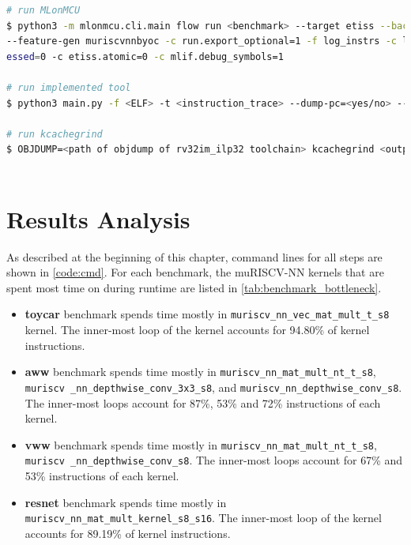 \medskip
\begin{center}
\begin{minipage}{\textwidth}
\begin{lstlisting}[language=bash]
# run MLonMCU
$ python3 -m mlonmcu.cli.main flow run <benchmark> --target etiss --backend tvmaotplus
--feature-gen muriscvnnbyoc -c run.export_optional=1 -f log_instrs -c log_instrs.to_file=1 -c riscv_gcc.install_dir=<path to rv32im_ilp32> -c etiss.fpu=none -c etiss.compr
essed=0 -c etiss.atomic=0 -c mlif.debug_symbols=1

# run implemented tool
$ python3 main.py -f <ELF> -t <instruction_trace> --dump-pc=<yes/no> --dump-pos=<yes/no>

# run kcachegrind
$ OBJDUMP=<path of objdump of rv32im_ilp32 toolchain> kcachegrind <output file from implemented tool>
    
\end{lstlisting}
\end{minipage}
\end{center}

\section{Results Analysis}

As described at the beginning of this chapter, command lines for all steps are shown in \cref{code:cmd}. For each benchmark, the muRISCV-NN kernels that are spent most time on during runtime are listed in \cref{tab:benchmark_bottleneck}.

\begin{itemize}
    \item \textbf{toycar} benchmark spends time mostly in \texttt{muriscv\_nn\_vec\_mat\_mult\_t\_s8} kernel. The inner-most loop of the kernel accounts for 94.80\% of kernel instructions.
        
    \item \textbf{aww} benchmark spends time mostly in \texttt{muriscv\_nn\_mat\_mult\_nt\_t\_s8}, \texttt{muriscv \_nn\_depthwise\_conv\_3x3\_s8}, and \texttt{muriscv\_nn\_depthwise\_conv\_s8}. The inner-most loops account for 87\%, 53\% and 72\% instructions of each kernel.
    
    \item \textbf{vww} benchmark spends time mostly in \texttt{muriscv\_nn\_mat\_mult\_nt\_t\_s8}, \texttt{muriscv \_nn\_depthwise\_conv\_s8}. The inner-most loops account for 67\% and 53\% instructions of each kernel.
    
    \item \textbf{resnet} benchmark spends time mostly in \texttt{muriscv\_nn\_mat\_mult\_kernel\_s8\_s16}. The inner-most loop of the kernel accounts for 89.19\% of kernel instructions. 
\end{itemize}

